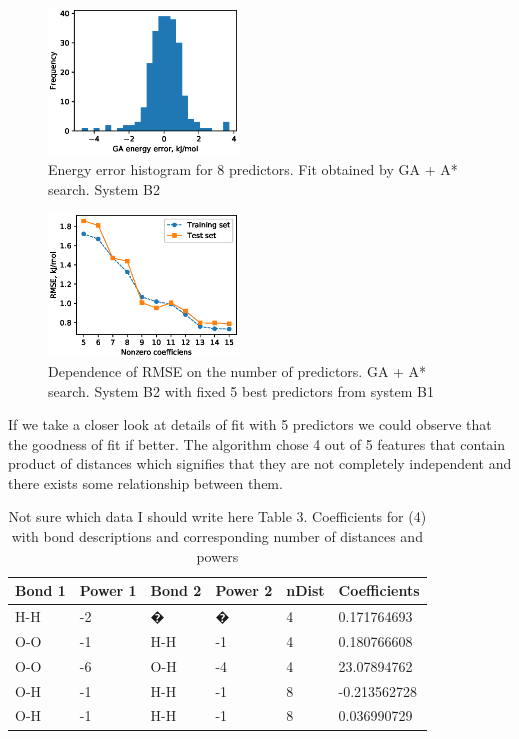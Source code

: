 \documentclass[aps,prl,reprint,amsmath,amssymb,nature]{revtex4-1}
\begin{document}
\begin{figure}
\includegraphics[width=0.45\textwidth]{media/B2_GA_energy_error_histogram_8_predictors.eps}
\caption{Energy error histogram for 8 predictors. Fit obtained by GA + A* search. System B2}\label{Fig:B2_histogram_8_predictors}
\end{figure}

\begin{figure}
\includegraphics[width=0.45\textwidth]{media/B2_VIP_GA_PATH_RMSE.eps}
\caption{Dependence of RMSE on the number of predictors. GA + A* search. System B2 with fixed 5 best predictors from system B1}\label{Fig:B2_VIP_RMSE}
\end{figure}


If we take a closer look at details of fit 
with 5 predictors we could observe that the goodness of fit if better. 
The algorithm chose 4 out of 5 features that contain product of 
distances which signifies that they are not completely independent and 
there exists some relationship between them.


\begin{table}[h]
\caption{\red Not sure which data I should write here \old Table 3. Coefficients for (4) with bond descriptions and corresponding number of distances and powers}
\label{Tab:B2 coefficients}
\begin{tabular}{|l|l|l|l|l|l|}
\hline
\textbf{Bond 1} & \textbf{Power 1} & \textbf{Bond 2} & \textbf{
Power 2} & \textbf{nDist} & \textbf{
Coefficients} \\
\hline
H-H & -2 & � & � & 4 & 0.171764693 \\
\hline
O-O & -1 & H-H & -1 & 4 & 0.180766608 \\
\hline
O-O & -6 & O-H & -4 & 4 & 23.07894762 \\
\hline
O-H & -1 & H-H & -1 & 8 & -0.213562728 \\
\hline
O-H & -1 & H-H & -1 & 8 & 0.036990729 \\
\hline
\end{tabular}
\end{table}
\end{document}
